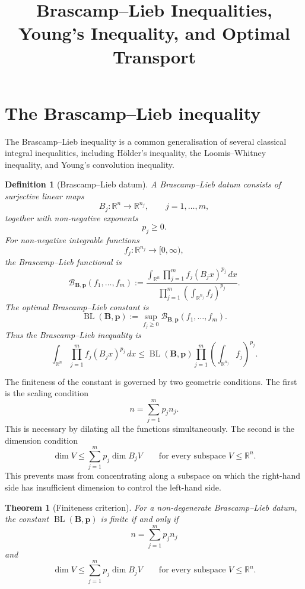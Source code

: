 \documentclass[11pt]{article}
\title{Brascamp--Lieb Inequalities, Young's Inequality, and Optimal Transport}
\author{}
\date{}
\newtheorem{theorem}{Theorem}
\newtheorem{definition}{Definition}
\DeclareMathOperator{\BL}{BL}
\begin{document}
\maketitle

\section{The Brascamp--Lieb inequality}

The Brascamp--Lieb inequality is a common generalisation of several classical
integral inequalities, including H\"older's inequality, the Loomis--Whitney
inequality, and Young's convolution inequality.

\begin{definition}[Brascamp--Lieb datum]
A Brascamp--Lieb datum consists of surjective linear maps
\[
        B_j : \mathbb R^n \longrightarrow \mathbb R^{n_j},
        \qquad j=1,\dots,m,
\]
together with non-negative exponents
\[
        p_j \geq 0.
\]
For non-negative integrable functions
\[
        f_j : \mathbb R^{n_j} \to [0,\infty),
\]
the Brascamp--Lieb functional is
\[
        \mathcal B_{\mathbf B,\mathbf p}(f_1,\dots,f_m)
        :=
        \frac{
        \displaystyle
        \int_{\mathbb R^n}
        \prod_{j=1}^m f_j(B_jx)^{p_j}\,dx
        }{
        \displaystyle
        \prod_{j=1}^m
        \left(\int_{\mathbb R^{n_j}} f_j\right)^{p_j}
        }.
\]
The optimal Brascamp--Lieb constant is
\[
        \BL(\mathbf B,\mathbf p)
        :=
        \sup_{f_j\geq 0}
        \mathcal B_{\mathbf B,\mathbf p}(f_1,\dots,f_m).
\]
Thus the Brascamp--Lieb inequality is
\[
        \int_{\mathbb R^n}
        \prod_{j=1}^m f_j(B_jx)^{p_j}\,dx
        \leq
        \BL(\mathbf B,\mathbf p)
        \prod_{j=1}^m
        \left(\int_{\mathbb R^{n_j}} f_j\right)^{p_j}.
\]
\end{definition}

The finiteness of the constant is governed by two geometric conditions. The
first is the scaling condition
\[
        n = \sum_{j=1}^m p_j n_j.
\]
This is necessary by dilating all the functions simultaneously. The second is
the dimension condition
\[
        \dim V
        \leq
        \sum_{j=1}^m p_j \dim B_jV
        \qquad
        \text{for every subspace } V\leq \mathbb R^n.
\]
This prevents mass from concentrating along a subspace on which the right-hand
side has insufficient dimension to control the left-hand side.

\begin{theorem}[Finiteness criterion]
For a non-degenerate Brascamp--Lieb datum, the constant
\(\BL(\mathbf B,\mathbf p)\) is finite if and only if
\[
        n = \sum_{j=1}^m p_j n_j
\]
and
\[
        \dim V
        \leq
        \sum_{j=1}^m p_j \dim B_jV
        \qquad
        \text{for every subspace } V\leq \mathbb R^n.
\]
\end{theorem}
\end{document}
